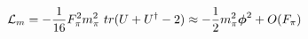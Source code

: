 \begin{equation}
{\cal{L}}_m= -\frac{1}{16} F_{\pi}^2 m_{\pi}^2 ~tr(U+U^{\dag} -2) \approx -\frac{1}{2} m_{\pi}^2 \mbox{\boldmath$\phi$}^2 +O(F_\pi)
\end{equation}

